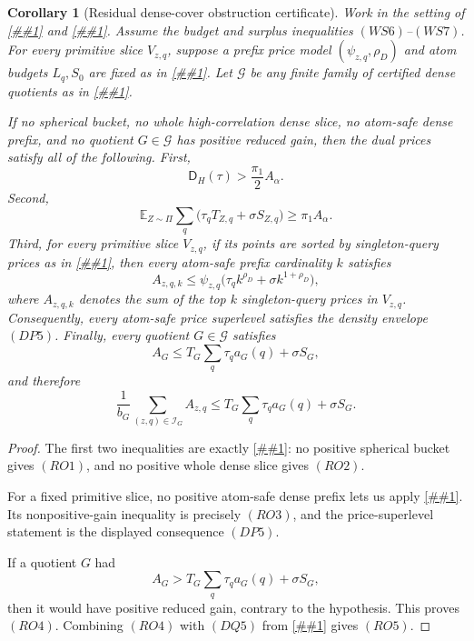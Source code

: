 \documentclass[10pt]{article}
\newcommand{\cref}[1]{\ref{##1}}
\newtheorem{corollary}[theorem]{Corollary}
\theoremstyle{definition}
\newcommand{\E}{\mathbb{E}}
\begin{document}
\begin{corollary}[Residual dense-cover obstruction certificate]
   \label{cor:residual-dense-cover-obstruction}
   Work in the setting of \cref{lem:weighted-spherical-reduced-gain} and
   \cref{lem:high-correlation-dense-slice-separator}.
   Assume the budget and surplus inequalities \((WS6)\)--\((WS7)\).  For every
   primitive slice \(V_{z,q}\), suppose a prefix price model
   \((\psi_{z,q},\rho_D)\) and atom budgets \(L_q,S_0\) are fixed as in
   \cref{lem:dense-slice-prefix-separation}.  Let \(\mathcal G\) be any finite
   family of certified dense quotients as in
   \cref{lem:dense-slice-quotient-separation}.

   If no spherical bucket, no whole high-correlation dense slice, no atom-safe
   dense prefix, and no quotient \(G\in\mathcal G\) has positive reduced gain,
   then the dual prices satisfy all of the following.
   First,
   \[
      \mathsf D_H(\tau)>\frac{\pi_1}{2}A_\alpha .
      \tag{RO1}
   \]
   Second,
   \[
      \E_{Z\sim\Pi}\sum_q
      \bigl(\tau_qT_{Z,q}+\sigma S_{Z,q}\bigr)
      \ge
      \pi_1A_\alpha .
      \tag{RO2}
   \]
   Third, for every primitive slice \(V_{z,q}\), if its points are sorted by
   singleton-query prices as in \cref{lem:dense-slice-prefix-separation}, then
   every atom-safe prefix cardinality \(k\) satisfies
   \[
      A_{z,q,k}
      \le
      \psi_{z,q}\bigl(\tau_qk^{\rho_D}+\sigma k^{1+\rho_D}\bigr),
      \tag{RO3}
   \]
   where \(A_{z,q,k}\) denotes the sum of the top \(k\) singleton-query prices in
   \(V_{z,q}\).  Consequently, every atom-safe price superlevel satisfies the
   density envelope \((DP5)\).
   Finally, every quotient \(G\in\mathcal G\) satisfies
   \[
      A_G\le T_G\sum_q\tau_qa_G(q)+\sigma S_G,
      \tag{RO4}
   \]
   and therefore
   \[
      \frac1{b_G}\sum_{(z,q)\in\mathcal I_G}A_{z,q}
      \le
      T_G\sum_q\tau_qa_G(q)+\sigma S_G .
      \tag{RO5}
   \]
\end{corollary}

\begin{proof}
   The first two inequalities are exactly
   \cref{cor:spherical-dense-moment-obstruction}: no positive spherical bucket
   gives \((RO1)\), and no positive whole dense slice gives \((RO2)\).

   For a fixed primitive slice, no positive atom-safe dense prefix lets us apply
   \cref{lem:dense-slice-prefix-separation}.  Its nonpositive-gain inequality is
   precisely \((RO3)\), and the price-superlevel statement is the displayed
   consequence \((DP5)\).

   If a quotient \(G\) had
   \[
      A_G>T_G\sum_q\tau_qa_G(q)+\sigma S_G,
   \]
   then it would have positive reduced gain, contrary to the hypothesis.  This
   proves \((RO4)\).  Combining \((RO4)\) with \((DQ5)\) from
   \cref{lem:dense-slice-quotient-separation} gives \((RO5)\).
\end{proof}
\end{document}
